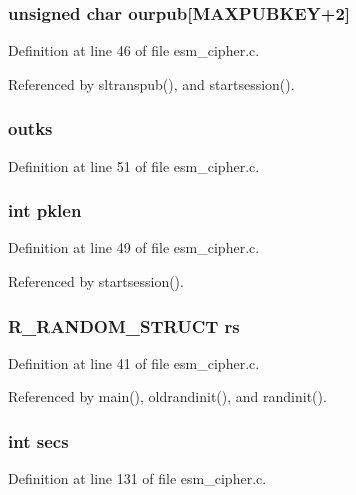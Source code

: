 \subsubsection{\setlength{\rightskip}{0pt plus 5cm}unsigned char {\bf ourpub}[MAXPUBKEY+2]}\label{esm__cipher_8c_a20}




Definition at line 46 of file esm\_\-cipher.c.

Referenced by sltranspub(), and startsession().
\subsubsection{ {\bf outks}}\label{esm__cipher_8c_a25}




Definition at line 51 of file esm\_\-cipher.c.
\subsubsection{\setlength{\rightskip}{0pt plus 5cm}int {\bf pklen}}\label{esm__cipher_8c_a23}




Definition at line 49 of file esm\_\-cipher.c.

Referenced by startsession().
\subsubsection{\setlength{\rightskip}{0pt plus 5cm}R\_\-RANDOM\_\-STRUCT {\bf rs}}\label{esm__cipher_8c_a17}




Definition at line 41 of file esm\_\-cipher.c.

Referenced by main(), oldrandinit(), and randinit().
\subsubsection{\setlength{\rightskip}{0pt plus 5cm}int {\bf secs}}\label{esm__cipher_8c_a26}




Definition at line 131 of file esm\_\-cipher.c.

